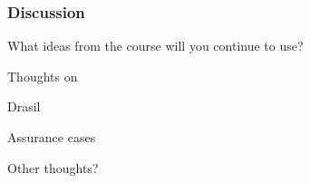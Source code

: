 \documentclass[t,12pt,numbers,fleqn]{beamer}
\begin{document}

\begin{frame}
\frametitle{Discussion}

\bi
\item What ideas from the course will you continue to use?
\item Thoughts on
\bi
\item Drasil
\item Assurance cases
\ei
\item Other thoughts?
\ei

\end{frame}

\end{document}
